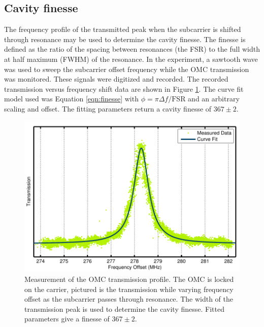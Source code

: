 \subsection{Cavity finesse}
\label{sec:finesse}
The frequency profile of the transmitted peak when the subcarrier is shifted through resonance may be used to determine the cavity finesse. %
The finesse is defined as the ratio of the spacing between resonances (the FSR) to the full width at half maximum (FWHM) of the resonance. %
In the experiment, a sawtooth wave was used to sweep the subcarrier offset frequency while the OMC transmission was monitored. %
These signals were digitized and recorded. %
The recorded transmission versus frequency shift data are shown in Figure \ref{fig:finesseFit}. %
The curve fit model used was Equation \ref{eqn:finesse} with $\phi=\pi \Delta f/\mathrm{FSR}$ and an arbitrary scaling and offset. %
The fitting parameters return a cavity finesse of $367\pm2$.


\begin{figure}[h!]
  \begin{center}
  \leavevmode
  \includegraphics{figs-omc/finesseFit.pdf}
  \end{center}
  \caption[Measurement of the OMC transmission profile.]{Measurement of the OMC transmission profile. The OMC is locked on the carrier, pictured is the transmission while varying frequency offset as the subcarrier passes through resonance. The width of the transmission peak is used to determine the cavity finesse. Fitted parameters give a finesse of $367\pm2$.}
  \label{fig:finesseFit}
\end{figure}

